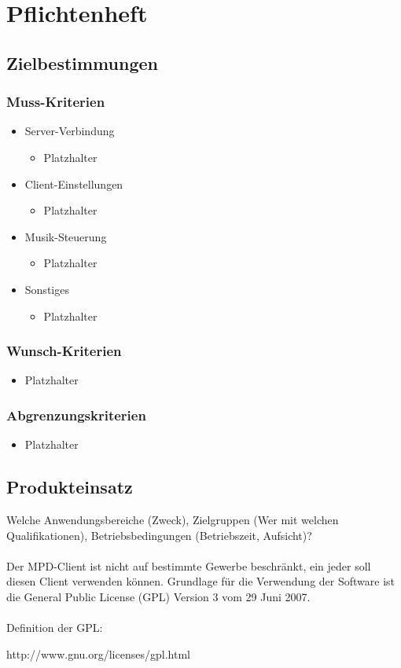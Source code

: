 \chapter{Pflichtenheft}
\section{Zielbestimmungen}
\subsection{Muss-Kriterien}
\renewcommand{\labelitemi}{•}
\begin{itemize}
	\item Server-Verbindung
	\begin{itemize}
		\item Platzhalter
	\end{itemize}
	\item Client-Einstellungen
	\begin{itemize}
		\item Platzhalter
	\end{itemize}
	\item Musik-Steuerung
	\begin{itemize}
		\item Platzhalter
	\end{itemize}
	\item Sonstiges
	\begin{itemize}
		\item Platzhalter
	\end{itemize}
\end{itemize}
\subsection{Wunsch-Kriterien}
\begin{itemize}
		\item Platzhalter
\end{itemize}
\subsection{Abgrenzungskriterien}
\begin{itemize}
		\item Platzhalter
\end{itemize}
\section{Produkteinsatz}
Welche Anwendungsbereiche (Zweck), Zielgruppen (Wer mit welchen Qualifikationen), Betriebsbedingungen (Betriebszeit,
Aufsicht)?\ \\ \\
Der MPD-Client ist nicht auf bestimmte Gewerbe beschränkt, ein jeder soll diesen Client
verwenden können. Grundlage für die Verwendung der Software ist die General Public License (GPL)
Version 3 vom 29 Juni 2007.\ \\ \\
Definition der GPL:
\begin{center}
http://www.gnu.org/licenses/gpl.html
\end{center}

